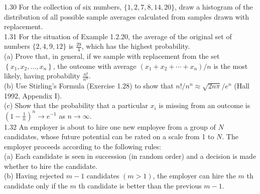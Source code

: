 \documentclass[10pt]{article}
\begin{document}
1.30 For the collection of six numbers, $\{1,2,7,8,14,20\}$, draw a histogram of the distribution of all possible sample averages calculated from samples drawn with replacement.\\
1.31 For the situation of Example 1.2.20, the average of the original set of numbers $\{2,4,9,12\}$ is $\frac{29}{4}$, which has the highest probability.\\
(a) Prove that, in general, if we sample with replacement from the set $\left\{x_{1}, x_{2}, \ldots, x_{n}\right\}$, the outcome with average $\left(x_{1}+x_{2}+\cdots+x_{n}\right) / n$ is the most likely, having probability $\frac{n!}{n^{n}}$.\\
(b) Use Stirling's Formula (Exercise 1.28) to show that $n!/ n^{n} \approx \sqrt{2 n \pi} / e^{n}$ (Hall 1992, Appendix I).\\
(c) Show that the probability that a particular $x_{i}$ is missing from an outcome is $\left(1-\frac{1}{n}\right)^{n} \rightarrow e^{-1}$ as $n \rightarrow \infty$.\\
1.32 An employer is about to hire one new employee from a group of $N$ candidates, whose future potential can be rated on a scale from 1 to $N$. The employer proceeds according to the following rules:\\
(a) Each candidate is seen in succession (in random order) and a decision is made whether to hire the candidate.\\
(b) Having rejected $m-1$ candidates $(m>1)$, the employer can hire the $m$ th candidate only if the $m$ th candidate is better than the previous $m-1$.
\end{document}
